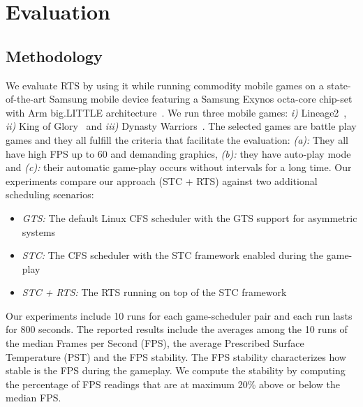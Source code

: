 \section{Evaluation}
\subsection{Methodology}
\label{sec.rts.methodology}
We evaluate RTS by using it while running commodity mobile games on a state-of-the-art Samsung mobile device featuring a Samsung Exynos octa-core chip-set with Arm big.LITTLE architecture~\cite{samsung,Greenhalgh2011}. 
We run three mobile games:
\textit{i)} Lineage2~\cite{Lineage}, \textit{ii)} King of Glory~\cite{KOG} and \textit{iii)} Dynasty Warriors~\cite{Dynasty}.
The selected games are battle play games and they all fulfill the criteria that facilitate the evaluation: \textit{(a):} They all have high FPS up to 60 and demanding graphics, \textit{(b):} they have auto-play mode and \textit{(c):} their automatic game-play occurs without intervals for a long time.
Our experiments compare our approach (STC + RTS) against two additional scheduling scenarios:
\begin{itemize}
	\item \textit{GTS:} The default Linux CFS scheduler with the GTS support for asymmetric systems
	\item \textit{STC:} The CFS scheduler with the STC framework enabled during the game-play
	\item \textit{STC + RTS:} The RTS running on top of the STC framework
\end{itemize}
Our experiments include 10 runs for each game-scheduler pair and each run lasts for 800 seconds. 
The reported results include the averages among the 10 runs of the median Frames per Second (FPS), the average Prescribed Surface Temperature (PST) and the FPS stability.
The FPS stability characterizes how stable is the FPS during the gameplay. 
We compute the stability by computing the percentage of FPS readings that are at maximum 20\% above or below the median FPS.
%
%

